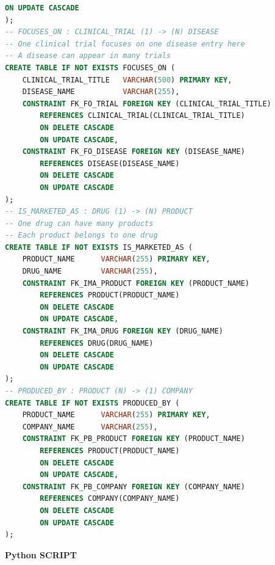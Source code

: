 \documentclass[15pt,a4paper]{article}
\begin{document}
\begin{lstlisting}[language=SQL,breaklines=true]
        ON UPDATE CASCADE
);
-- FOCUSES_ON : CLINICAL_TRIAL (1) -> (N) DISEASE
-- One clinical trial focuses on one disease entry here
-- A disease can appear in many trials
CREATE TABLE IF NOT EXISTS FOCUSES_ON (
    CLINICAL_TRIAL_TITLE   VARCHAR(500) PRIMARY KEY,
    DISEASE_NAME           VARCHAR(255),
    CONSTRAINT FK_FO_TRIAL FOREIGN KEY (CLINICAL_TRIAL_TITLE)
        REFERENCES CLINICAL_TRIAL(CLINICAL_TRIAL_TITLE)
        ON DELETE CASCADE
        ON UPDATE CASCADE,
    CONSTRAINT FK_FO_DISEASE FOREIGN KEY (DISEASE_NAME)
        REFERENCES DISEASE(DISEASE_NAME)
        ON DELETE CASCADE
        ON UPDATE CASCADE
);
-- IS_MARKETED_AS : DRUG (1) -> (N) PRODUCT
-- One drug can have many products
-- Each product belongs to one drug
CREATE TABLE IF NOT EXISTS IS_MARKETED_AS (
    PRODUCT_NAME      VARCHAR(255) PRIMARY KEY,
    DRUG_NAME         VARCHAR(255),
    CONSTRAINT FK_IMA_PRODUCT FOREIGN KEY (PRODUCT_NAME)
        REFERENCES PRODUCT(PRODUCT_NAME)
        ON DELETE CASCADE
        ON UPDATE CASCADE,
    CONSTRAINT FK_IMA_DRUG FOREIGN KEY (DRUG_NAME)
        REFERENCES DRUG(DRUG_NAME)
        ON DELETE CASCADE
        ON UPDATE CASCADE
);
-- PRODUCED_BY : PRODUCT (N) -> (1) COMPANY
CREATE TABLE IF NOT EXISTS PRODUCED_BY (
    PRODUCT_NAME      VARCHAR(255) PRIMARY KEY,
    COMPANY_NAME      VARCHAR(255),
    CONSTRAINT FK_PB_PRODUCT FOREIGN KEY (PRODUCT_NAME)
        REFERENCES PRODUCT(PRODUCT_NAME)
        ON DELETE CASCADE
        ON UPDATE CASCADE,
    CONSTRAINT FK_PB_COMPANY FOREIGN KEY (COMPANY_NAME)
        REFERENCES COMPANY(COMPANY_NAME)
        ON DELETE CASCADE
        ON UPDATE CASCADE
);

\end{lstlisting}
\newpage
\textbf{Python SCRIPT}\par
\end{document}
